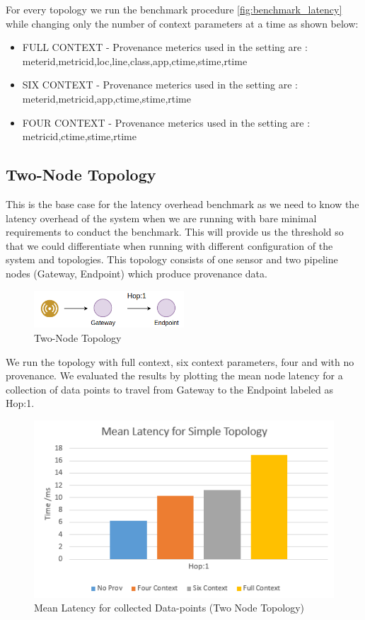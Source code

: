 For every topology we run the benchmark procedure \ref{fig:benchmark_latency} while changing only the number of context parameters at a time as shown below:

\begin{itemize}
	\item FULL CONTEXT - Provenance meterics used in the setting are :
	meterid,metricid,loc,line,class,app,ctime,stime,rtime
	\item SIX CONTEXT - Provenance meterics used in the setting are :
	meterid,metricid,app,ctime,stime,rtime
	\item FOUR CONTEXT - Provenance meterics used in the setting are :
	metricid,ctime,stime,rtime
\end{itemize}


\subsection{Two-Node Topology}
This is the base case for the latency overhead benchmark as we need to know the latency overhead of the system when we are running with bare minimal requirements to conduct the benchmark. This will provide us the threshold so that we could differentiate when running with different configuration of the system and topologies. This topology consists of one sensor and two pipeline nodes (Gateway, Endpoint) which produce provenance data. 

\begin{figure}[H]
	\center
	\includegraphics[width=0.5\textwidth]{figures/latencytopo_two.png}
	\caption{Two-Node Topology}
	\label{fig:two_topo}
\end{figure}

We run the topology with full context, six context parameters, four and with no provenance. We evaluated the results by plotting the mean node latency for a collection of data points
to travel from Gateway to the Endpoint labeled as Hop:1.

\begin{figure}[H]
	\center
	\includegraphics[width=\textwidth]{figures/simpletopology_latency.png}
	\caption{Mean Latency for collected Data-points (Two Node Topology)}
	\label{fig:twotopology_latency}
\end{figure}

